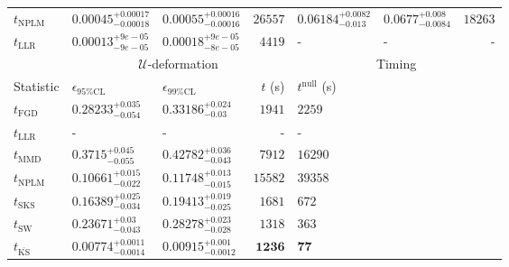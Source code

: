 \begin{tabular}{l|llr|llr}
\rowcolor{red!35}	$t_{\mathrm{NPLM}}$ & $0.00045_{-0.00018}^{+0.00017}$ & $0.00055_{-0.00016}^{+0.00016}$ & $26557$ & $0.06184_{-0.013}^{+0.0082}$ & $0.0677_{-0.0084}^{+0.008}$ & $18263$ \\
	$t_{\mathrm{LLR}}$ & $0.00013_{-9e-05}^{+9e-05}$ & $0.00018_{-8e-05}^{+9e-05}$ & $4419$ & - & - & - \\
	\toprule
	\multicolumn{1}{c}{} & \multicolumn{3}{c}{$\mathcal{U}$-deformation} & \multicolumn{3}{c}{Timing} \\
	Statistic & $\epsilon_{95\%\mathrm{CL}}$ & $\epsilon_{99\%\mathrm{CL}}$ & $t$ (s) & $t^{\mathrm{null}}$ (s) \\
	\midrule
	$t_{\mathrm{FGD}}$ & $0.28233_{-0.054}^{+0.035}$ & $0.33186_{-0.03}^{+0.024}$ & $1941$ & $2259$ \\
	$t_{\mathrm{LLR}}$ & - & - & - & - \\
	$t_{\mathrm{MMD}}$ & $0.3715_{-0.055}^{+0.045}$ & $0.42782_{-0.043}^{+0.036}$ & $7912$ & $16290$ \\
\rowcolor{red!35}	$t_{\mathrm{NPLM}}$ & $0.10661_{-0.022}^{+0.015}$ & $0.11748_{-0.015}^{+0.013}$ & $15582$ & $39358$ \\
	$t_{\mathrm{SKS}}$ & $0.16389_{-0.034}^{+0.025}$ & $0.19413_{-0.025}^{+0.019}$ & $1681$ & $672$ \\
	$t_{\mathrm{SW}}$ & $0.23671_{-0.043}^{+0.03}$ & $0.28278_{-0.028}^{+0.023}$ & $1318$ & $363$ \\
	$t_{\overline{\mathrm{KS}}}$ & ${\mathbf{0.00774_{-0.0014}^{+0.0011}}}$ & ${\mathbf{0.00915_{-0.0012}^{+0.001}}}$ & ${\mathbf{1236}}$ & ${\mathbf{77}}$ \\
	\bottomrule
\end{tabular}